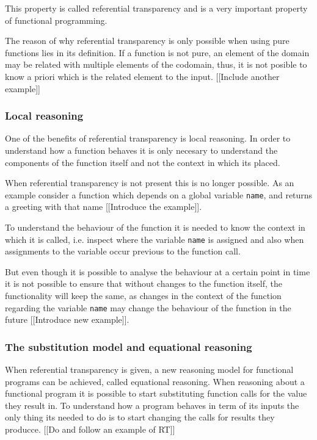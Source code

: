\documentclass[../main.tex]{subfiles}
\begin{document}
This property is called referential transparency \autocite{Strachey2000FundamentalLanguages} and is a very important property of functional programming.

The reason of why referential transparency is only possible when using pure functions lies in its definition. If a function is not pure, an element of the domain may be related with multiple elements of the codomain, thus, it is not posible to know a priori which is the related element to the input. [[Include another example]]

\subsubsection{Local reasoning}
One of the benefits of referential transparency is local reasoning. In order to understand how a function behaves it is only necesary to understand the components of the function itself and not the context in which its placed. 

When referential transparency is not present this is no longer possible. As an example consider a function which depends on a global variable \texttt{name}, and returns a greeting with that name [[Introduce the example]].



To understand the behaviour of the function it is needed to know the context in which it is called, i.e. inspect where the variable \texttt{name} is assigned and also when assignments to the variable occur previous to the function call.

But even though it is possible to analyse the behaviour at a certain point in time it is not possible to ensure that without changes to the function itself, the functionality will keep the same, as changes in the context of the function regarding the variable \texttt{name} may change the behaviour of the function in the future [[Introduce new example]].

\subsubsection{The substitution model and equational reasoning}

When referential transparency is given, a new reasoning model for functional programs can be achieved, called equational reasoning. When reasoning about a functional program it is possible to start substituting function calls for the value they result in.
To understand how a program behaves in term of its inputs the only thing its needed to do is to start changing the calls for results they producce. [[Do and follow an example of RT]]
\end{document}
